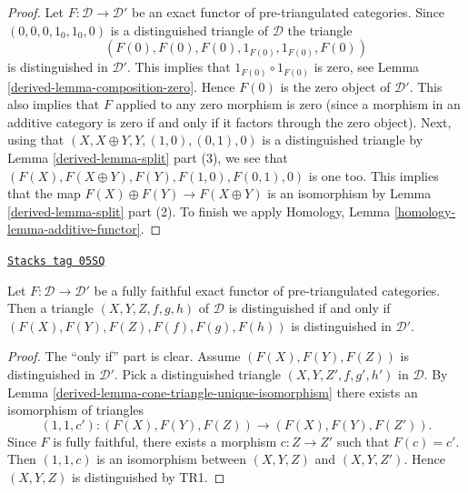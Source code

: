 \begin{proof}

Let $F : \mathcal{D} \to \mathcal{D}'$ be an exact functor of
pre-triangulated categories. Since
$(0, 0, 0, 1_0, 1_0, 0)$ is a distinguished triangle of $\mathcal{D}$
the triangle
$$
(F(0), F(0), F(0), 1_{F(0)}, 1_{F(0)}, F(0))
$$
is distinguished in $\mathcal{D}'$.
This implies that $1_{F(0)} \circ 1_{F(0)}$ is zero, see
Lemma \ref{derived-lemma-composition-zero}.
Hence $F(0)$ is the zero object of $\mathcal{D}'$. This also implies
that $F$ applied to any zero morphism is zero (since a morphism in
an additive category is zero if and only if it factors through the
zero object). Next, using that
$(X, X \oplus Y, Y, (1, 0), (0, 1), 0)$ is a distinguished triangle by
Lemma \ref{derived-lemma-split} part (3), we see that
$(F(X), F(X \oplus Y), F(Y), F(1, 0), F(0, 1), 0)$ is
one too. This implies that the map $F(X) \oplus F(Y) \to F(X \oplus Y)$
is an isomorphism by Lemma \ref{derived-lemma-split} part (2). To finish we apply
Homology, Lemma \ref{homology-lemma-additive-functor}.
\end{proof}

\begin{lemma}
\label{derived-lemma-exact-equivalence}
\href{https://stacks.math.columbia.edu/tag/05SQ}{\texttt{Stacks tag 05SQ}}

Let $F : \mathcal{D} \to \mathcal{D}'$ be a fully faithful exact functor
of pre-triangulated categories. Then a triangle $(X, Y, Z, f, g, h)$
of $\mathcal{D}$ is distinguished if and only if
$(F(X), F(Y), F(Z), F(f), F(g), F(h))$ is distinguished in $\mathcal{D}'$.
\end{lemma}

\begin{proof}

The ``only if'' part is clear. Assume $(F(X), F(Y), F(Z))$ is
distinguished in $\mathcal{D}'$. Pick a distinguished triangle
$(X, Y, Z', f, g', h')$ in $\mathcal{D}$. By
Lemma \ref{derived-lemma-cone-triangle-unique-isomorphism}
there exists an isomorphism of triangles
$$
(1, 1, c') : (F(X), F(Y), F(Z)) \longrightarrow (F(X), F(Y), F(Z')).
$$
Since $F$ is fully faithful, there exists a morphism $c : Z \to Z'$
such that $F(c) = c'$. Then $(1, 1, c)$ is an isomorphism between
$(X, Y, Z)$ and $(X, Y, Z')$. Hence $(X, Y, Z)$ is distinguished
by TR1.
\end{proof}


